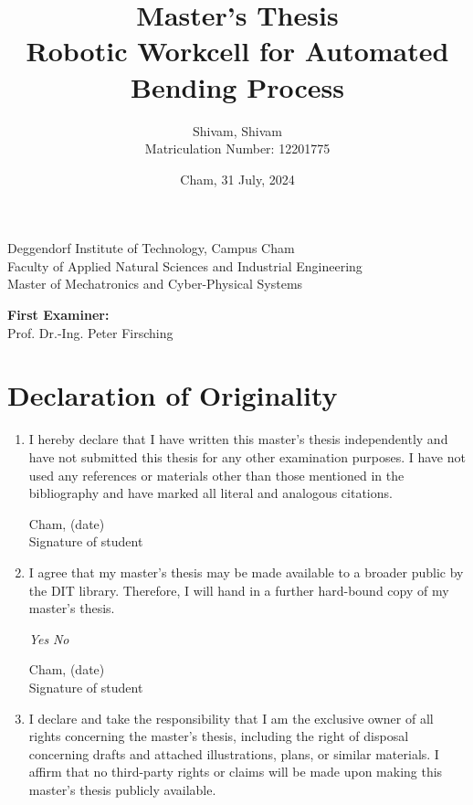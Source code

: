\documentclass{article}
\title{Master's Thesis \\ Robotic Workcell for Automated Bending Process}
\author{Shivam, Shivam \\ Matriculation Number: 12201775}
\date{Cham, 31 July, 2024}
\begin{document}
\maketitle
\begin{center}
\Large{Deggendorf Institute of Technology, Campus Cham} \\
\Large{Faculty of Applied Natural Sciences and Industrial Engineering} \\
\Large{Master of Mechatronics and Cyber-Physical Systems}
\end{center}

\vspace{1cm}

\textbf{First Examiner:} \\
Prof. Dr.-Ing. Peter Firsching

\vspace{1cm}

\section*{Declaration of Originality}
\begin{enumerate}
    \item I hereby declare that I have written this master's thesis independently and have not submitted this thesis for any other examination purposes. I have not used any references or materials other than those mentioned in the bibliography and have marked all literal and analogous citations.
    
    \vspace{0.5cm}
    \begin{flushright}
    Cham, (date) \\
    \vspace{0.5cm}
    Signature of student
    \end{flushright}

    \item I agree that my master's thesis may be made available to a broader public by the DIT library. Therefore, I will hand in a further hard-bound copy of my master's thesis.
    
    \vspace{0.5cm}
    \textit{Yes} \hspace{2cm} \textit{No}
    
    \vspace{0.5cm}
    \begin{flushright}
    Cham, (date) \\
    \vspace{0.5cm}
    Signature of student
    \end{flushright}
    
    \item I declare and take the responsibility that I am the exclusive owner of all rights concerning the master's thesis, including the right of disposal concerning drafts and attached illustrations, plans, or similar materials. I affirm that no third-party rights or claims will be made upon making this master's thesis publicly available.
\end{enumerate}
\end{document}
